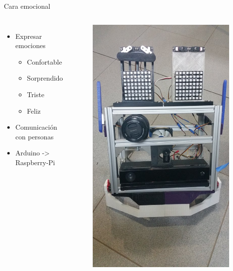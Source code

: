 \documentclass[10pt]{beamer}
\begin{document}
\begin{frame}{Cara emocional}
	\begin{columns}
			\begin{itemize}
            	\item Expresar emociones
                	\begin{itemize}
                    	\item Confortable
                		\item Sorprendido
                        \item Triste
                        \item Feliz
                	\end{itemize}
                \item Comunicación con personas
				\item Arduino -> Raspberry-Pi 
			\end{itemize}
			\begin{center}
				\begin{figure}
					\includegraphics[width=1\textwidth]{img/cara.jpg}

\end{figure}
\end{center}
\end{columns}
\end{frame}
\end{document}
